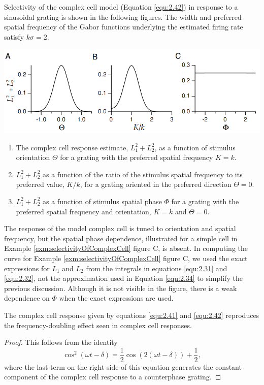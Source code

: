 \begin{exm}
  \label{exm:selectivityOfComplexCell}
  Selectivity of the complex cell model (Equation \ref{equ:2.42}) in response to a sinusoidal grating is shown in the following figures.
  The width and preferred spatial frequency of the Gabor functions underlying the estimated firing rate satisfy $k\sigma = 2$.
  \begin{center}
    \includegraphics[scale=0.3]{./png/spatialPhaseInvariantExm1}
  \end{center}
  \begin{enumerate}[A]
  \item The complex cell response estimate, $L_1^2+L_2^2$, as a function of stimulus orientation $\Theta$ for a grating with the preferred spatial frequency $K = k$.
  \item $L_1^2+L_2^2$ as a function of the ratio of the stimulus spatial frequency to its preferred value, $K/k$, for a grating oriented in the preferred direction $\Theta = 0$.
  \item $L_1^2+L_2^2$ as a function of stimulus spatial phase $\Phi$ for a grating with the preferred spatial frequency and orientation, $K = k$ and $\Theta = 0$.
  \end{enumerate}
\end{exm}

\begin{rem}
  The response of the model complex cell is tuned to orientation and spatial frequency, but the spatial phase dependence, illustrated for a simple cell in Example \ref{exm:selectivityOfComplexCell} figure C, is absent. In computing the curve for Example \ref{exm:selectivityOfComplexCell} figure C, we used the exact expressions for $L_1$ and $L_2$ from the integrals in equations \ref{equ:2.31} and \ref{equ:2.32}, not the approximation used in Equation \ref{equ:2.34} to simplify the previous discussion. Although it is not visible in the figure, there is a weak dependence on $\Phi$ when the exact expressions are used.
\end{rem}

\begin{prop}
  The complex cell response given by equations \ref{equ:2.41} and \ref{equ:2.42} reproduces the frequency-doubling effect seen in complex cell responses.
\end{prop}
\begin{proof}
  This follows from the identity
  \begin{equation}
    \label{equ:2.43}
    \cos^2(\omega t-\delta)=\frac{1}{2}\cos(2(\omega t-\delta))+\frac{1}{2},
  \end{equation}
  where the last term on the right side of this equation generates the
constant component of the complex cell response to a counterphase grating.
\end{proof}

